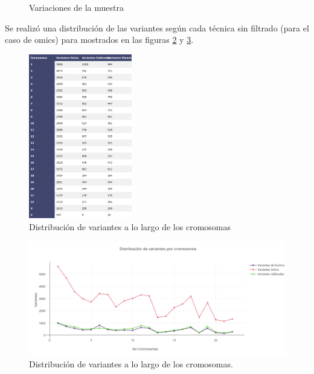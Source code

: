 \begin{figure}[H]
	\caption{Variaciones de la muestra}
	\label{f:histogramas}
\end{figure}

Se realizó una distribución de las variantes según cada técnica sin filtrado (para el caso de omics) para mostrados en las  figuras  \ref{fig:tabla1} y \ref{fig:distribucion}. \\

\begin{figure}[]
	\centering
	\includegraphics[width=0.4\textwidth]{Kap2/latex_table}
	\caption{Distribución de variantes a lo largo de los cromosomas} \label{fig:tabla1}
\end{figure}

\begin{figure}[]
	\centering
	\includegraphics[width=1\textwidth]{Kap2/variaciones}
	\caption{Distribución de variantes a lo largo de los cromosomas.} \label{fig:distribucion}
\end{figure}

